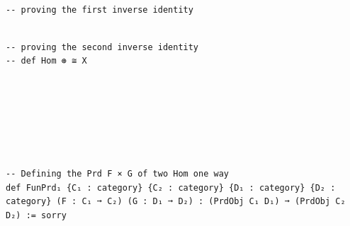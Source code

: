 \documentclass{book}
\newcounter{lcounter}
\newcounter{sectioncount}
\newcounter{subsectioncount}
\renewcommand{\section}[1]{\newpage
\ \\
\ \\
 \begin{center} \scalebox{1.5}{\texttt{\thesectioncount . #1}} \setcounter{sectioncount}{\thesectioncount+1} \setcounter{subsectioncount}{1} \end{center}
 \begin{center}

\ \\
\ \\

\thispagestyle{empty}
\end{center}
}
\begin{document}
\begin{center}
\begin{tcolorbox}[width=5in,colback={white},title={\begin{center}\texttt{Lean \thelcounter} \addtocounter{lcounter}{1}  \end{center}},colbacktitle=Blue,coltitle=black]
\begin{verbatim}

-- proving the first inverse identity

\end{verbatim}%
\end{tcolorbox}
\end{center}


\begin{center}
\begin{tcolorbox}[width=5in,colback={white},title={\begin{center}\texttt{Lean \thelcounter} \addtocounter{lcounter}{1}  \end{center}},colbacktitle=Blue,coltitle=black]
\begin{verbatim}

-- proving the second inverse identity
-- def Hom ⊛ ≅ X

\end{verbatim}%
\end{tcolorbox}
\end{center}


\section{Fox's Theorem} %


\begin{center}
\begin{tcolorbox}[width=5in,colback={white},title={\begin{center}\texttt{Lean \thelcounter} \addtocounter{lcounter}{1}  \end{center}},colbacktitle=Blue,coltitle=black]
\begin{verbatim}

-- Defining the Prd F × G of two Hom one way
def FunPrd₁ {C₁ : category} {C₂ : category} {D₁ : category} {D₂ : category} (F : C₁ ➞ C₂) (G : D₁ ➞ D₂) : (PrdObj C₁ D₁) ➞ (PrdObj C₂ D₂) := sorry

\end{verbatim}%
\end{tcolorbox}
\end{center}
\end{document}
